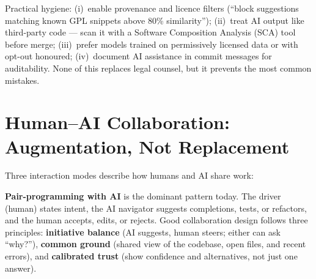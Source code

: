 Practical hygiene: (i)~enable provenance and licence filters (``block suggestions matching known GPL snippets above 80\% similarity''); (ii)~treat AI output like third-party code --- scan it with a Software Composition Analysis (SCA) tool before merge; (iii)~prefer models trained on permissively licensed data or with opt-out honoured; (iv)~document AI assistance in commit messages for auditability. None of this replaces legal counsel, but it prevents the most common mistakes.

\section{Human--AI Collaboration: Augmentation, Not Replacement}\label{sec:collab}
Three interaction modes describe how humans and AI share work:

\begin{center}
\end{center}

\textbf{Pair-programming with AI} is the dominant pattern today. The driver (human) states intent, the AI navigator suggests completions, tests, or refactors, and the human accepts, edits, or rejects. Good collaboration design follows three principles: \textbf{initiative balance} (AI suggests, human steers; either can ask ``why?''), \textbf{common ground} (shared view of the codebase, open files, and recent errors), and \textbf{calibrated trust} (show confidence and alternatives, not just one answer).

